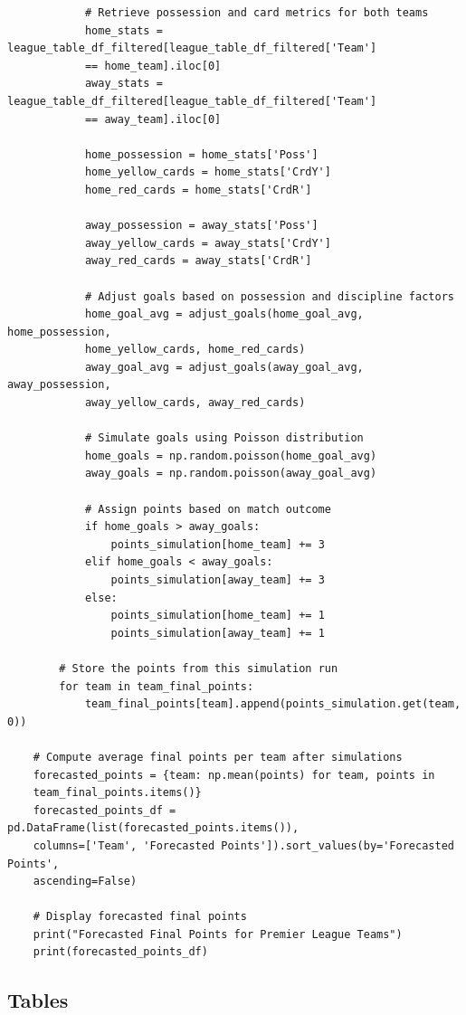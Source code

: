 \documentclass{article}
\begin{document}
\begin{verbatim}
            # Retrieve possession and card metrics for both teams
            home_stats = league_table_df_filtered[league_table_df_filtered['Team'] 
            == home_team].iloc[0]
            away_stats = league_table_df_filtered[league_table_df_filtered['Team'] 
            == away_team].iloc[0]

            home_possession = home_stats['Poss']
            home_yellow_cards = home_stats['CrdY']
            home_red_cards = home_stats['CrdR']

            away_possession = away_stats['Poss']
            away_yellow_cards = away_stats['CrdY']
            away_red_cards = away_stats['CrdR']

            # Adjust goals based on possession and discipline factors
            home_goal_avg = adjust_goals(home_goal_avg, home_possession, 
            home_yellow_cards, home_red_cards)
            away_goal_avg = adjust_goals(away_goal_avg, away_possession, 
            away_yellow_cards, away_red_cards)

            # Simulate goals using Poisson distribution
            home_goals = np.random.poisson(home_goal_avg)
            away_goals = np.random.poisson(away_goal_avg)

            # Assign points based on match outcome
            if home_goals > away_goals:
                points_simulation[home_team] += 3
            elif home_goals < away_goals:
                points_simulation[away_team] += 3
            else:
                points_simulation[home_team] += 1
                points_simulation[away_team] += 1

        # Store the points from this simulation run
        for team in team_final_points:
            team_final_points[team].append(points_simulation.get(team, 0))

    # Compute average final points per team after simulations
    forecasted_points = {team: np.mean(points) for team, points in 
    team_final_points.items()}
    forecasted_points_df = pd.DataFrame(list(forecasted_points.items()), 
    columns=['Team', 'Forecasted Points']).sort_values(by='Forecasted Points', 
    ascending=False)

    # Display forecasted final points
    print("Forecasted Final Points for Premier League Teams")
    print(forecasted_points_df)
\end{verbatim}

\subsection*{Tables}
\end{document}
